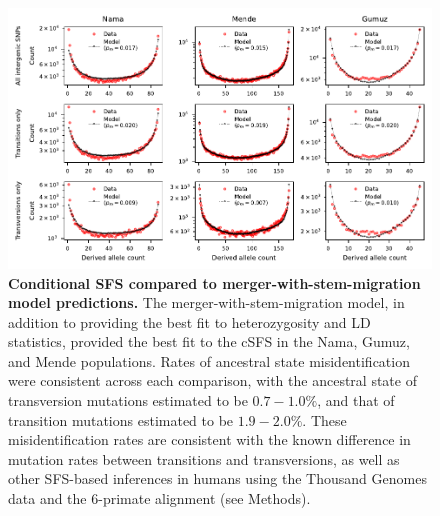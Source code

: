 \documentclass[]{article}
\begin{document}
\begin{figure}[ht]
    \centering
    \includegraphics{figures/supp-csfs-merger-with-stem-migration.pdf}
    \caption{
        \textbf{Conditional SFS compared to merger-with-stem-migration model predictions.}
        The merger-with-stem-migration model, in addition to providing the best
        fit to heterozygosity and LD statistics, provided the best fit to the cSFS
        in the Nama, Gumuz, and Mende populations. Rates of ancestral state
        misidentification were consistent across each comparison, with the
        ancestral state of transversion mutations estimated to be $0.7-1.0\%$, and
        that of transition mutations estimated to be $1.9-2.0\%$. These
        misidentification rates are consistent with the known difference in mutation
        rates between transitions and transversions, as well as other SFS-based
        inferences in humans using the Thousand Genomes data and the 6-primate
        alignment (see Methods). 
    }
    \label{fig:supp-csfs-merger-with-stem-migration}
\end{figure}
\end{document}
